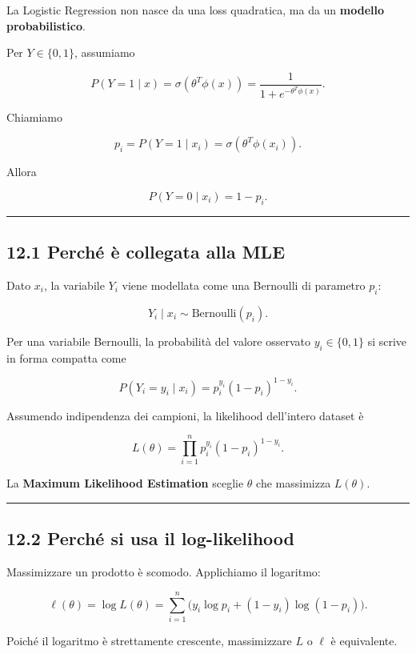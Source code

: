 \documentclass{article}
\begin{document}
La Logistic Regression non nasce da una loss quadratica, ma da un
\textbf{modello probabilistico}.

Per \(Y\in\{0,1\}\), assumiamo

\[
P(Y=1\mid x)=\sigma(\theta^T\phi(x))
=
\frac{1}{1+e^{-\theta^T\phi(x)}}.
\]

Chiamiamo

\[
p_i = P(Y=1\mid x_i)=\sigma(\theta^T\phi(x_i)).
\]

Allora

\[
P(Y=0\mid x_i)=1-p_i.
\]

\begin{center}\rule{0.5\linewidth}{0.5pt}\end{center}

\subsection{12.1 Perché è collegata alla
MLE}\label{perchuxe9-uxe8-collegata-alla-mle}

Dato \(x_i\), la variabile \(Y_i\) viene modellata come una Bernoulli di
parametro \(p_i\):

\[
Y_i\mid x_i \sim \text{Bernoulli}(p_i).
\]

Per una variabile Bernoulli, la probabilità del valore osservato
\(y_i\in\{0,1\}\) si scrive in forma compatta come

\[
P(Y_i=y_i\mid x_i)=p_i^{y_i}(1-p_i)^{1-y_i}.
\]

Assumendo indipendenza dei campioni, la likelihood dell'intero dataset è

\[
L(\theta)=\prod_{i=1}^n p_i^{y_i}(1-p_i)^{1-y_i}.
\]

La \textbf{Maximum Likelihood Estimation} sceglie \(\theta\) che
massimizza \(L(\theta)\).

\begin{center}\rule{0.5\linewidth}{0.5pt}\end{center}

\subsection{12.2 Perché si usa il
log-likelihood}\label{perchuxe9-si-usa-il-log-likelihood}

Massimizzare un prodotto è scomodo. Applichiamo il logaritmo:

\[
\ell(\theta)=\log L(\theta)
=
\sum_{i=1}^n \Big(y_i\log p_i + (1-y_i)\log(1-p_i)\Big).
\]

Poiché il logaritmo è strettamente crescente, massimizzare \(L\) o
\(\ell\) è equivalente.
\end{document}
